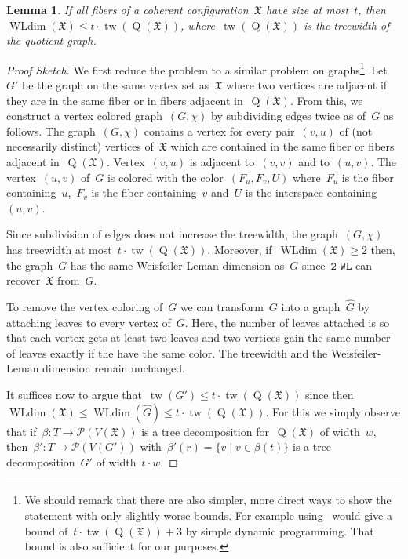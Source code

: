 \documentclass[english,a4paper]{article}
\theoremstyle{plain}
\newtheorem{lemma}      [theorem]{Lemma}
\theoremstyle{definition}
\newcommand{\coherentConfig}{\ensuremath{\mathfrak{X}}}
\DeclareMathOperator*{\WLdim}{WLdim}
\newcommand{\wldim}[1]{\ensuremath{\WLdim\left(#1\right)}}
\newcommand{\wld}[1]{\texttt{#1-WL}}
\newcommand{\wltwo}{\wld{2}\xspace}
\DeclareMathOperator*{\Quotient}{Q}
\newcommand{\quotientGraph}[1]{\ensuremath{\Quotient(#1)}}
\DeclareMathOperator{\treewidth}{tw}
\begin{document}
\begin{lemma}
\label{lem:bd:tw:and:fibre:size:bd:WL}
    If all fibers of a coherent configuration~$\coherentConfig$ have size at most~$t$, then~$\wldim{\coherentConfig}\leq t\cdot \treewidth(\quotientGraph{\coherentConfig})$, where~$\treewidth(\quotientGraph{\coherentConfig})$ is the treewidth of the quotient graph.
\end{lemma}
\begin{proof}[Proof Sketch]
    We first reduce the problem to a similar problem on graphs\footnote{We should remark that there are also simpler, more direct ways to show the statement with only slightly worse bounds. For example using~\cite{DBLP:conf/swat/OtachiS14} would give a bound of~$t\cdot \treewidth(\quotientGraph{\coherentConfig})+3$ by simple dynamic programming. That bound is also sufficient for our purposes.}.
    Let~$G'$ be the graph on the same vertex set as~$\coherentConfig$ where two vertices are adjacent if they are in the same fiber or in fibers adjacent in~$\quotientGraph{\coherentConfig}$.
    From this, we construct a vertex colored graph~$(G,\chi)$ by subdividing edges twice as of~$G$ as follows. The graph~$(G,\chi)$ contains a vertex for every pair~$(v,u)$ of (not necessarily distinct) vertices of~$\coherentConfig$ which are contained in the same fiber or fibers adjacent in~$\quotientGraph{\coherentConfig}$.
    Vertex~$(v,u)$ is adjacent to~$(v,v)$ and to~$(u,v)$.
    The vertex~$(u,v)$ of~$G$ is colored with the color~$(F_u,F_v,U)$ where~$F_u$ is the fiber containing~$u$,~$F_v$ is the fiber containing~$v$ and~$U$ is the interspace containing~$(u,v)$.


    Since subdivision of edges does not increase the treewidth, the graph~$(G,\chi)$ has treewidth at most~$t\cdot \treewidth(\quotientGraph{\coherentConfig})$.
    Moreover, if~$\wldim{\coherentConfig}\geq 2$ then, the graph~$G$ has the same Weisfeiler-Leman dimension as~$G$ since~$\wltwo$ can recover~$\coherentConfig$ from~$G$.

    To remove the vertex coloring of~$G$ we can transform~$G$ into a graph~$\widehat{G}$ by attaching leaves to every vertex of~$G$. Here, the number of leaves attached is so that each vertex gets at least two leaves and two vertices gain the same number of leaves exactly if the have the same color. The treewidth and the Weisfeiler-Leman dimension remain unchanged.

    It suffices now to argue that~$\treewidth(G')\leq t\cdot  \treewidth(\quotientGraph{\coherentConfig})$ since then~$\wldim{\coherentConfig}\leq  \WLdim(\widehat{G})\leq t\cdot \treewidth(\quotientGraph{\coherentConfig})$.
    For this we simply observe that if~$\beta\colon T\rightarrow \mathcal{P}(V(\coherentConfig))$ is a tree decomposition for~$\quotientGraph{\coherentConfig}$ of width~$w$, then~$\beta'\colon T\rightarrow \mathcal{P}(V(G'))$ with~$\beta'(r) = \{v\mid v\in \beta(t)\}$ is a tree decomposition~$G'$ of width~$t\cdot w$.
\end{proof}
 
\end{document}
